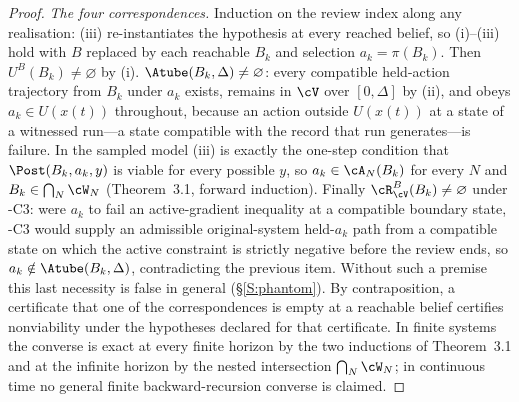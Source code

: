 \begin{proof}
\emph{The four correspondences.} Induction on the review index along any realisation: (iii) re-instantiates the hypothesis at every reached belief, so (i)--(iii) hold with $B$ replaced by each reachable $B_k$ and selection $a_k=\pi(B_k)$. Then $U^B(B_k)\ne\varnothing$ by (i). $\Atube(B_k,\Delta)\ne\varnothing$: every compatible held-action trajectory from $B_k$ under $a_k$ exists, remains in $\cV$ over $[0,\Delta]$ by (ii), and obeys $a_k\in U(x(t))$ throughout, because an action outside $U(x(t))$ at a state of a witnessed run---a state compatible with the record that run generates---is failure. In the sampled model (iii) is exactly the one-step condition that $\Post(B_k,a_k,y)$ is viable for every possible $y$, so $a_k\in\cA_N(B_k)$ for every $N$ and $B_k\in\bigcap_N\cW_N$ (Theorem~3.1, forward induction). Finally $\cR^B_\cV(B_k)\ne\varnothing$ under \hyp{C3}: were $a_k$ to fail an active-gradient inequality at a compatible boundary state, \hyp{C3} would supply an admissible original-system held-$a_k$ path from a compatible state on which the active constraint is strictly negative before the review ends, so $a_k\notin\Atube(B_k,\Delta)$, contradicting the previous item. Without such a premise this last necessity is false in general (\S\ref{S:phantom}). By contraposition, a certificate that one of the correspondences is empty at a reachable belief certifies nonviability under the hypotheses declared for that certificate. In finite systems the converse is exact at every finite horizon by the two inductions of Theorem~3.1 and at the infinite horizon by the nested intersection $\bigcap_N\cW_N$; in continuous time no general finite backward-recursion converse is claimed.
\end{proof}

